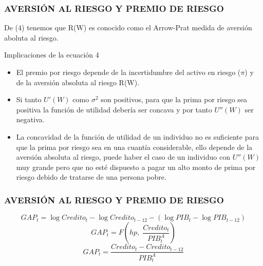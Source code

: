 \begin{frame}
    \frametitle{AVERSIÓN AL RIESGO Y PREMIO DE RIESGO}
    De (4) tenemos que R(W) es conocido como el Arrow-Prat medida de aversión aboluta al riesgo.\\
    
    \begin{block} {Implicaciones de la ecuación 4}
       \begin{itemize}
           \item El premio por riesgo depende de la incertidumbre del activo en riesgo ($\pi $) y de la aversión absoluta al riesgo R(W). 
           \item Si tanto $U'(W) $ como $\sigma^{2}$ son positivos, para que la prima por riesgo sea positiva la función de utilidad debería ser concava y por tanto  $U''(W) $ ser negativa.
           \item La concavidad de la función de utilidad de un individuo no es suficiente para que la prima por riesgo sea en una cuantía considerable, ello depende de la aversión absoluta al riesgo, puede haber el caso de un individuo con $U''(W) $ muy grande pero que no esté dispuesto a pagar un alto monto de prima por riesgo debido de tratarse de una persona pobre.
       \end{itemize} 
    \end{block}	
    
\end{frame}

\begin{frame}
\frametitle{AVERSIÓN AL RIESGO Y PREMIO DE RIESGO}

\begin{equation*}
GAP_{t}=\log{Credito_{t}}-\log{Credito_{t-12}}-(\log{PIB_{t}}-\log{PIB_{t-12}})
\end{equation*}
\begin{equation*}
GAP_{t}=F(hp, \; \frac{Credito_{t}}{PIB_{t}^{A}})
\end{equation*}
\begin{equation*}
GAP_{t}=\frac{Credito_{t}-Credito_{t-12}}{PIB_{t}^{A}}
\end{equation*}
\end{frame}

